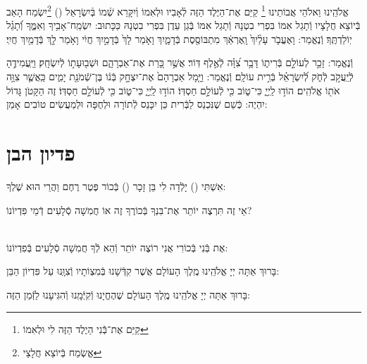 \documentclass[twoside, openany, parskip=half, 11pt]{book}
\begin{document}
\begin{sometimes}
אֱלֹהֵֽינוּ וֵאלֹהֵי אֲבוֹתֵינוּ \footnote{
קַיֵּם אֶת־בְּֿֿנִי הַיֶלֶד הַזֶּה לִי וּלְאִמוֹ} קַיֵּם אֶת־הַיֶּלֶד הַזֶּה לְֿאָבִיו וּלְאִמוֹ וְֿיִקָּרֵא שְֿׁמוֹ בְּֿיִשְׂרָאֵל () \footnote{
אֱשְׂמַח בְּֿיוֹצֵא חֲלָצַי}יִשְׂמַח הָאַב בְּֿיוֹצֵא חֲלָצָיו וְֿתָגֵל אִמּוֹ בִּפְרִי בִטְנָהּ וְֿתָגֵל אִמּוֹ בְּֿגַן עֵדֶן בִּפְרִי בִטְנָהּ
כַּכָּתוּב: יִשְׂמַֽח־אָבִ֥יךָ וְאִמֶּ֑ךָ וְֿ֝תָגֵ֗ל יֽוֹלַדְתֶּֽךָ׃
וְֿנֶאֱמַר: וָאֶעֱבֹ֤ר עָלַ֨יִךְ֙ וָֽאֶרְאֵ֔ךְ מִתְבּוֹסֶ֖סֶת בְּֿדָמָ֑יִךְ
וָאֹ֤מַר לָךְ֙ בְּֿדָמַ֣יִךְ חֲיִ֔י וָאֹ֥מַר לָ֖ךְ בְּֿדָמַ֥יִךְ חֲיִֽי׃


וְֿנֶאֱמַר: זָכַ֣ר לְעוֹלָ֣ם בְּֿרִית֑וֹ דָּבָ֥ר צִ֝וָּ֗ה לְֿאֶ֣לֶף דּֽוֹר׃ אֲשֶׁ֣ר כָּ֭רַת אֶת־אַבְרָהָ֑ם
וּשְׁב֖וּעָת֣וֹ לְֿיִשְׂחָֽק׃ וַיַּֽעֲמִידֶ֣הָ לְֿיַֽעֲקֹ֣ב לְֿחֹ֑ק לְֿ֝יִשְׂרָאֵ֗ל בְּֿרִ֣ית עוֹלָֽם׃
וְֿנֶאֱמַר: וַיָּ֤מָל אַבְרָהָם֙ אֶת־יִצְחָ֣ק בְּֿנ֔וֹ בֶּן־שְֿׁמֹנַ֖ת יָמִ֑ים כַּֽאֲשֶׁ֛ר צִוָּ֥ה אֹת֖וֹ אֱלֹהִֽים׃ הוֹד֣וּ לַֽיְיָ֑ כִּי־ט֑וֹב כִּ֖י לְֿעוֹלָ֣ם חַסְדּֽוֹ׃
הוֹד֣וּ לַֽיְיָ֑ כִּי־ט֑וֹב כִּ֖י לְֿעוֹלָ֣ם חַסְדּֽוֹ׃
 זֶה הַקָּטֹן גָּדוֹל יִהְיֶה:
כְּֿשֵׁם שֶׁנִּכְנַס לַבְּֿרִית כֵּן יִכָּנֵס לְֿתוֹרָה וּלְחֻפָּה וּלְמַעֲשִׂים טוֹבִים אָמֵן:

\vfill
\sepline

\chapter[פדיון הבן]{ פדיון הבן }


אִשְׁתִּי () יָלְֿדָה לִי בֵּן זָכָר () בְּֿכוֹר פֶּטֶר רֶחֶם וַהֲרֵי הוּא שֶׁלְךָ:

אֵי זֶה תִּרְצֶה יוֹתֵר אֶת־בִּנְךָ בְּֿכוֹרֶךָ זֶה אוֹ חֲמִשָׁה סְֿלָעִים דְֿמֵי פִּדְיוֹנוֹ?

\\
אֶת בְּֿנִי בְּֿכוֹרִי אֲנִי רוֹצֶה יוֹתֵר וְֿהֵא לְֿךָ חֲמִשָׁה סְֿלָעִים בְּֿפִדְיוֹנוֹ:

בָּרוּךְ אַתָּה יְיָ אֱלֹהֵֽינוּ מֶֽלֶךְ הָעוֹלָם אֲשֶׁר קִדְּֿשָׁנוּ בְּֿמִצְוֹתָיו וְֿצִוָּֽנוּ עַל פִּדְיוֹן הַבֵּן:

בָּרוּךְ אַתָּה יְיָ אֱלֹהֵֽינוּ מֶֽלֶךְ הָעוֹלָם שֶׁהֶחֱיָנוּ וְֿקִיְּֿמָֽנוּ וְֿהִגִּיעָנוּ לַזְּֿמַן הַזֶּה:



\end{sometimes}
\end{document}
